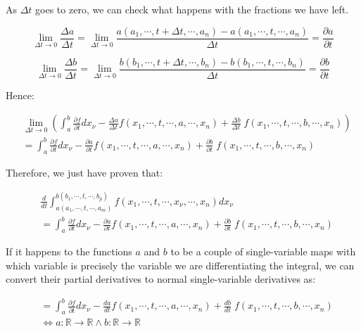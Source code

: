 \documentclass[12pt]{article}
\begin{document}
	As $\Delta t$ goes to zero, we can check what happens with the fractions we have left.
	
	\[
		\lim_{\Delta t \to 0} \frac{\Delta a}{\Delta t}
		= \lim_{\Delta t \to 0} \frac{a(a_1, \cdots, t + \Delta t, \cdots, a_n) - a(a_1, \cdots, t, \cdots, a_n)}{\Delta t} = \frac{\partial a}{\partial t}
	\]
	
	\[
		\lim_{\Delta t \to 0} \frac{\Delta b}{\Delta t}
		= \lim_{\Delta t \to 0} \frac{b(b_1, \cdots, t + \Delta t, \cdots, b_n) - b(b_1, \cdots, t, \cdots, b_n)}{\Delta t} = \frac{\partial b}{\partial t}
	\]
	
	Hence:
	
	\[
		\begin{aligned}
			& \lim_{\Delta t \to 0} \left( \int_a^b \frac{\partial f}{\partial t} dx_\nu - \frac{\Delta a}{\Delta t} f(x_1, \cdots, t, \cdots, a, \cdots, x_n) + \frac{\Delta b}{\Delta t} \; f(x_1, \cdots, t, \cdots, b, \cdots, x_n) \right)
			\\
			& = \int_a^b \frac{\partial f}{\partial t} dx_\nu - \frac{\partial a}{\partial t} f(x_1, \cdots, t, \cdots, a, \cdots, x_n) + \frac{\partial b}{\partial t} \; f(x_1, \cdots, t, \cdots, b, \cdots, x_n)
		\end{aligned}
	\]
	
	Therefore, we just have proven that:
	
	\[
		\begin{aligned}
			& \frac{d}{dt} \int_{a(a_1, \cdots, t, \cdots, a_m)}^{b(b_1, \cdots, t, \cdots, b_p)} f(x_1, \cdots, t, \cdots, x_\nu, \cdots, x_n) dx_\nu
			\\
			& = \int_a^b \frac{\partial f}{\partial t} dx_\nu - \frac{\partial a}{\partial t} f(x_1, \cdots, t, \cdots, a, \cdots, x_n) + \frac{\partial b}{\partial t} \; f(x_1, \cdots, t, \cdots, b, \cdots, x_n)
		\end{aligned}
	\]
	
	If it happens to the functions $a$ and $b$ to be a couple of single-variable maps with which variable is precisely the variable we are differentiating the integral, we can convert their partial derivatives to normal single-variable derivatives as:
	
	\[
		\begin{aligned}
			& = \int_a^b \frac{\partial f}{\partial t} dx_\nu - \frac{da}{dt} f(x_1, \cdots, t, \cdots, a, \cdots, x_n) + \frac{db}{dt} \; f(x_1, \cdots, t, \cdots, b, \cdots, x_n)
			\\
			& \iff a : \mathbb{R} \to \mathbb{R} \wedge b : \mathbb{R} \to \mathbb{R}
		\end{aligned}
	\]
	
\end{document}
